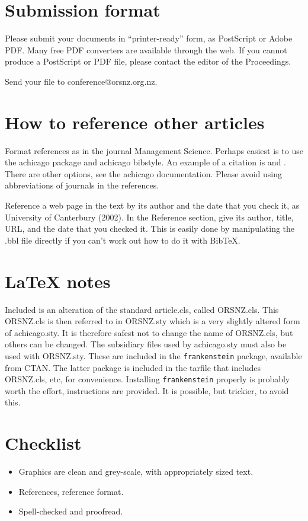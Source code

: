 \documentclass[12pt]{ORSNZ}
\begin{document}
\section{Submission format}
Please submit your documents in ``printer-ready'' form, as PostScript or
Adobe PDF. Many free PDF converters are available through the web. If
you cannot produce a PostScript or PDF file, please contact the editor
of the Proceedings.

Send your file to conference@orsnz.org.nz.

\section{How to reference other articles}
Format references as in the journal Management Science. Perhaps easiest
is to use the achicago package and achicago bibstyle. An example of a
citation is \cite{dantzig-fulkerson-johnson} and \cite{kruskal}. There
are other options,  see the achicago documentation. Please avoid using
abbreviations of journals in the references.

Reference a web page in the text by its author and the date that you check
it, as University of Canterbury (2002). In the Reference section, give its
author, title, URL, and the date that you checked it. This is easily done
by manipulating the .bbl file directly if you can't work out how to do it
with BibTeX.

\section{LaTeX notes}

Included is an alteration of the standard article.cls, called ORSNZ.cls.
This ORSNZ.cls is then referred to in ORSNZ.sty which is a very slightly
altered form of achicago.sty. It is therefore safest not to change the
name of ORSNZ.cls, but others can be changed. The subsidiary files used
by achicago.sty must also be used with ORSNZ.sty. These are included in
the {\tt frankenstein} package, available from CTAN. The latter package
is included in the tarfile that includes ORSNZ.cls, etc, for convenience.
Installing {\tt frankenstein} properly is probably worth the effort,
instructions are provided. It is possible, but trickier, to avoid this.

\section{Checklist}
\begin{itemize}
\item Graphics are clean and grey-scale, with appropriately sized text.
\item References, reference format.
\item Spell-checked and proofread.
\end{itemize}
\end{document}

